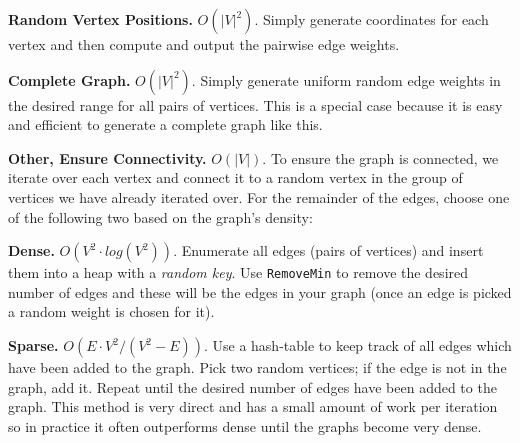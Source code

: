 \begin{description}
  \item \textbf{Random Vertex Positions.} $O(|V|^2)$.  Simply generate
    coordinates for each vertex and then compute and output the pairwise edge
    weights.

  \item \textbf{Complete Graph.} $O(|V|^2)$.  Simply generate uniform random
    edge weights in the desired range for all pairs of vertices.  This is a
    special case because it is easy and efficient to generate a complete graph
    like this.

  \item \textbf{Other, Ensure Connectivity.} $O(|V|)$.  To ensure the graph is
    connected, we iterate over each vertex and connect it to a random vertex in
    the group of vertices we have already iterated over.  For the remainder of
    the edges, choose one of the following two based on the graph's density:


  \item \textbf{Dense.}  $O(V^2 \cdot log(V^2))$.  Enumerate all edges (pairs of
    vertices) and insert them into a heap with a \textit{random key}.  Use
    \texttt{RemoveMin} to remove the desired number of edges and these will be
    the edges in your graph (once an edge is picked a random weight is chosen
    for it).

  \item \textbf{Sparse.}  $O(E \cdot V^2 / (V^2 - E))$.  Use a hash-table to
    keep track of all edges which have been added to the graph.  Pick two random
    vertices; if the edge is not in the graph, add it.  Repeat until the desired
    number of edges have been added to the graph.  This method is very direct
    and has a small amount of work per iteration so in practice it often
    outperforms dense until the graphs become very dense.
\end{description}

